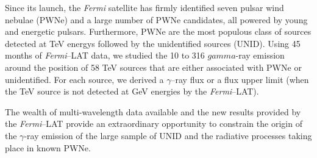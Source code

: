 Since its launch, the \emph{Fermi} satellite has firmly identified seven pulsar wind nebulae (PWNe) and a large number of PWNe candidates, all powered by young and energetic pulsars. Furthermore, PWNe are the most populous class of sources detected at TeV energys followed by the unidentified sources (UNID). Using 45 months of \emph{Fermi}--LAT data, we studied the 10 \gev to 316 \gev $gamma$-ray emission around the position of 58 TeV sources that are either associated with PWNe or unidentified. For each source, we derived a $\gamma$--ray flux or a flux upper limit (when the TeV source is not detected at GeV energies by the \emph{Fermi}--LAT).

The wealth of multi-wavelength data available and the new results provided by the \emph{Fermi}--LAT provide an extraordinary opportunity to constrain the origin of the $\gamma$-ray emission of the large sample of UNID and the radiative processes taking place in known PWNe. 
